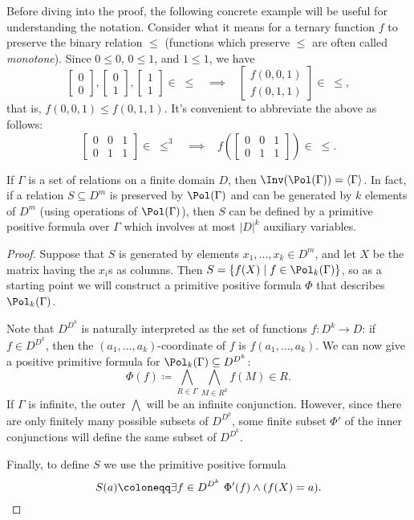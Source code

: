 Before diving into the proof, the following concrete example will be useful for understanding the notation. Consider what it means for a ternary function $f$ to preserve the binary relation $\le$ (functions which preserve $\le$ are often called \emph{monotone}). Since $0 \le 0$, $0 \le 1$, and $1 \le 1$, we have
\[
\begin{bmatrix} 0\\ 0 \end{bmatrix}, \begin{bmatrix} 0\\ 1 \end{bmatrix}, \begin{bmatrix} 1\\ 1 \end{bmatrix} \in \; \le \;\;\; \implies \;\;\; \begin{bmatrix} f(0,0,1)\\ f(0,1,1) \end{bmatrix} \in \; \le,
\]
that is, $f(0,0,1) \le f(0,1,1)$. It's convenient to abbreviate the above as follows:
\[
\begin{bmatrix} 0 & 0 & 1\\ 0 & 1 & 1 \end{bmatrix} \in \; \le^3 \;\;\; \implies \;\;\; f\left(\begin{bmatrix} 0 & 0 & 1\\ 0 & 1 & 1 \end{bmatrix}\right) \in \; \le.
\]

\begin{thm} If $\Gamma$ is a set of relations on a finite domain $D$, then $\Inv(\Pol(\Gamma)) = \langle \Gamma \rangle$. In fact, if a relation $S \subseteq D^m$ is preserved by $\Pol(\Gamma)$ and can be generated by $k$ elements of $D^m$ (using operations of $\Pol(\Gamma)$), then $S$ can be defined by a primitive positive formula over $\Gamma$ which involves at most $|D|^k$ auxiliary variables.
\end{thm}
\begin{proof} Suppose that $S$ is generated by elements $x_1, ..., x_k \in D^m$, and let $X$ be the matrix having the $x_i$s as columns. Then $S = \{f(X) \mid f \in \Pol_k(\Gamma)\}$, so as a starting point we will construct a primitive positive formula $\Phi$ that describes $\Pol_k(\Gamma)$.

Note that $D^{D^k}$ is naturally interpreted as the set of functions $f : D^k \rightarrow D$: if $f \in D^{D^k}$, then the $(a_1, ..., a_k)$-coordinate of $f$ is $f(a_1, ..., a_k)$. We can now give a positive primitive formula for $\Pol_k(\Gamma) \subseteq D^{D^k}$:
\[
\Phi(f) \coloneqq \bigwedge_{R \in \Gamma} \bigwedge_{M \in R^k} f(M) \in R.
\]
If $\Gamma$ is infinite, the outer $\bigwedge$ will be an infinite conjunction. However, since there are only finitely many possible subsets of $D^{D^k}$, some finite subset $\Phi'$ of the inner conjunctions will define the same subset of $D^{D^k}$.

Finally, to define $S$ we use the primitive positive formula
\[
S(a) \coloneqq \exists f \in D^{D^k}\ \Phi'(f) \wedge (f(X) = a).\qedhere
\]
\end{proof}

